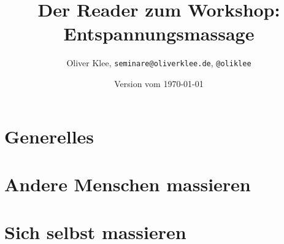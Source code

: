 \documentclass[a4paper,twoside,11pt,titlepage,openany]{scrbook}
\author{Oliver Klee, \texttt{seminare@oliverklee.de}, \texttt{@oliklee}}
\title{Der Reader zum Workshop: Entspannungsmassage}
\date{Version vom \today}
\begin{document}
\nocite*{}

\maketitle
\frontmatter

\tableofcontents

\mainmatter

\chapter{Generelles}


\chapter{Andere Menschen massieren}






\chapter{Sich selbst massieren}


\backmatter

\end{document}
